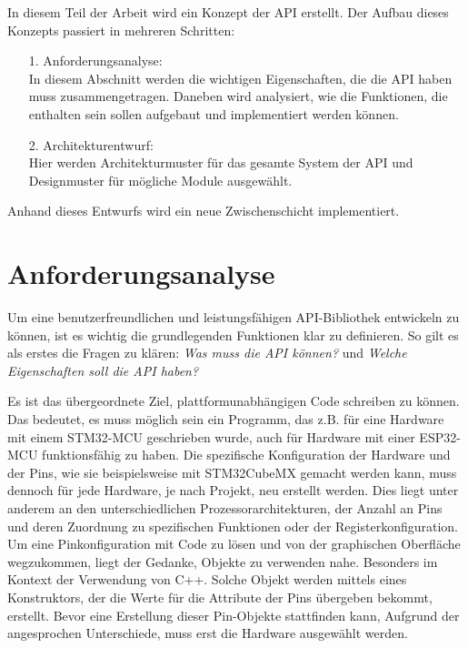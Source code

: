 
In diesem Teil der Arbeit wird ein Konzept der API erstellt.
Der Aufbau dieses Konzepts passiert in mehreren Schritten:
\begin{itemize}
	\item [1.] Anforderungsanalyse: \\In diesem Abschnitt werden die wichtigen Eigenschaften, die die API haben muss zusammengetragen. Daneben wird analysiert, wie die Funktionen, die enthalten sein sollen aufgebaut und implementiert werden können.
	\item [2.] Architekturentwurf: \\Hier werden Architekturmuster für das gesamte System der API und Designmuster für mögliche Module ausgewählt.
\end{itemize}

Anhand dieses Entwurfs wird ein neue Zwischenschicht implementiert.

\section{Anforderungsanalyse}
Um eine benutzerfreundlichen und leistungsfähigen API-Bibliothek entwickeln zu können, ist es wichtig die grundlegenden Funktionen klar zu definieren.
So gilt es als erstes die Fragen zu klären: \emph{Was muss die API können?} und \emph{Welche Eigenschaften soll die API haben?}

Es ist das übergeordnete Ziel, plattformunabhängigen Code schreiben zu können.
Das bedeutet, es muss möglich sein ein Programm, das z.B. für eine Hardware mit einem STM32-MCU geschrieben wurde, auch für Hardware mit einer ESP32-MCU funktionsfähig zu haben.
Die spezifische Konfiguration der Hardware und der Pins, wie sie beispielsweise mit STM32CubeMX gemacht werden kann, muss dennoch für jede Hardware, je nach Projekt, neu erstellt werden.
Dies liegt unter anderem an den unterschiedlichen Prozessorarchitekturen, der Anzahl an Pins und deren Zuordnung zu spezifischen Funktionen oder der Registerkonfiguration.
Um eine Pinkonfiguration mit Code zu lösen und von der graphischen Oberfläche wegzukommen, liegt der Gedanke, Objekte zu verwenden nahe.
Besonders im Kontext der Verwendung von C++.
Solche Objekt werden mittels eines Konstruktors, der die Werte für die Attribute der Pins übergeben bekommt, erstellt.
Bevor eine Erstellung dieser Pin-Objekte stattfinden kann, Aufgrund der angesprochen Unterschiede, muss erst die Hardware ausgewählt werden.

